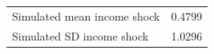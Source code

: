 \begin{tabular}{lc}
\toprule
Simulated mean income shock & 0.4799 \\
Simulated SD income shock & 1.0296 \\
\bottomrule
\end{tabular}

